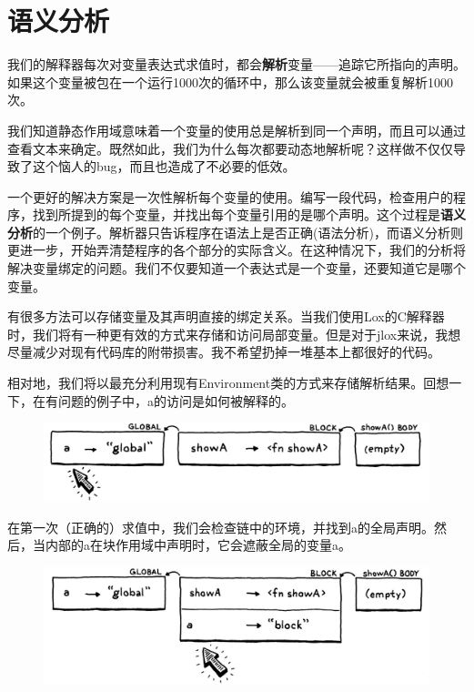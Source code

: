 \documentclass[cn,11pt,chinese]{elegantbook}
\begin{document}
{\section{语义分析}

我们的解释器每次对变量表达式求值时，都会\textbf{解析}变量——追踪它所指向的声明。如果这个变量被包在一个运行1000次的循环中，那么该变量就会被重复解析1000次。

我们知道静态作用域意味着一个变量的使用总是解析到同一个声明，而且可以通过查看文本来确定。既然如此，我们为什么每次都要动态地解析呢？这样做不仅仅导致了这个恼人的bug，而且也造成了不必要的低效。

一个更好的解决方案是一次性解析每个变量的使用。编写一段代码，检查用户的程序，找到所提到的每个变量，并找出每个变量引用的是哪个声明。这个过程是\textbf{语义分析}的一个例子。解析器只告诉程序在语法上是否正确(语法分析)，而语义分析则更进一步，开始弄清楚程序的各个部分的实际含义。在这种情况下，我们的分析将解决变量绑定的问题。我们不仅要知道一个表达式是一个变量，还要知道它是哪个变量。

有很多方法可以存储变量及其声明直接的绑定关系。当我们使用Lox的C解释器时，我们将有一种更有效的方式来存储和访问局部变量。但是对于jlox来说，我想尽量减少对现有代码库的附带损害。我不希望扔掉一堆基本上都很好的代码。

相对地，我们将以最充分利用现有Environment类的方式来存储解析结果。回想一下，在有问题的例子中，a的访问是如何被解释的。

\begin{figure}[htbp]
  \centering
  \includegraphics[width=\textwidth]{image/resolving-and-binding/environment-3.png}
\end{figure}

在第一次（正确的）求值中，我们会检查链中的环境，并找到a的全局声明。然后，当内部的a在块作用域中声明时，它会遮蔽全局的变量a。

\begin{figure}[htbp]
  \centering
  \includegraphics[width=\textwidth]{image/resolving-and-binding/environment-5.png}
\end{figure}

}
\end{document}
